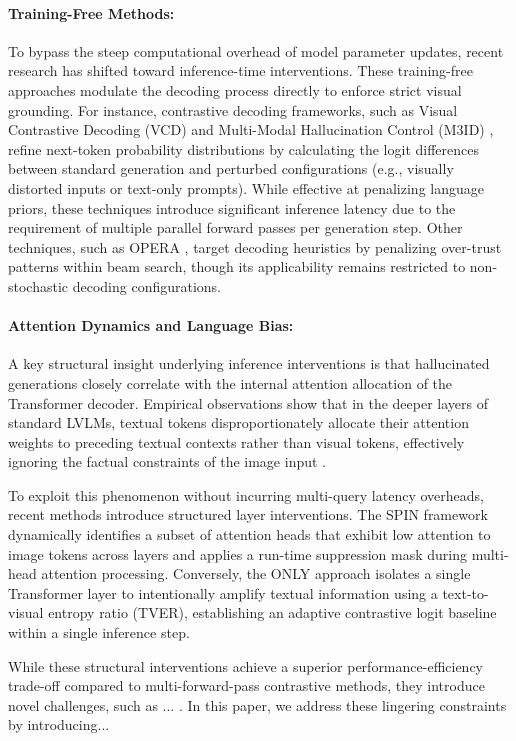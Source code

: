\paragraph{Training-Free Methods:}
To bypass the steep computational overhead of model parameter updates, recent research has shifted toward inference-time interventions. These training-free approaches modulate the decoding process directly to enforce strict visual grounding. For instance, contrastive decoding frameworks, such as Visual Contrastive Decoding (VCD) \cite{vcd} and Multi-Modal Hallucination Control (M3ID) \cite{m3id}, refine next-token probability distributions by calculating the logit differences between standard generation and perturbed configurations (e.g., visually distorted inputs or text-only prompts). While effective at penalizing language priors, these techniques introduce significant inference latency due to the requirement of multiple parallel forward passes per generation step. Other techniques, such as OPERA \cite{opera}, target decoding heuristics by penalizing over-trust patterns within beam search, though its applicability remains restricted to non-stochastic decoding configurations.

\paragraph{Attention Dynamics and Language Bias:}
A key structural insight underlying inference interventions is that hallucinated generations closely correlate with the internal attention allocation of the Transformer decoder. Empirical observations show that in the deeper layers of standard LVLMs, textual tokens disproportionately allocate their attention weights to preceding textual contexts rather than visual tokens, effectively ignoring the factual constraints of the image input \cite{spin, only}. 

To exploit this phenomenon without incurring multi-query latency overheads, recent methods introduce structured layer interventions. The SPIN framework \cite{spin} dynamically identifies a subset of attention heads that exhibit low attention to image tokens across layers and applies a run-time suppression mask during multi-head attention processing. Conversely, the ONLY approach \cite{only} isolates a single Transformer layer to intentionally amplify textual information using a text-to-visual entropy ratio (TVER), establishing an adaptive contrastive logit baseline within a single inference step. 

While these structural interventions achieve a superior performance-efficiency trade-off compared to multi-forward-pass contrastive methods, they introduce novel challenges, such as ... . In this paper, we address these lingering constraints by introducing...